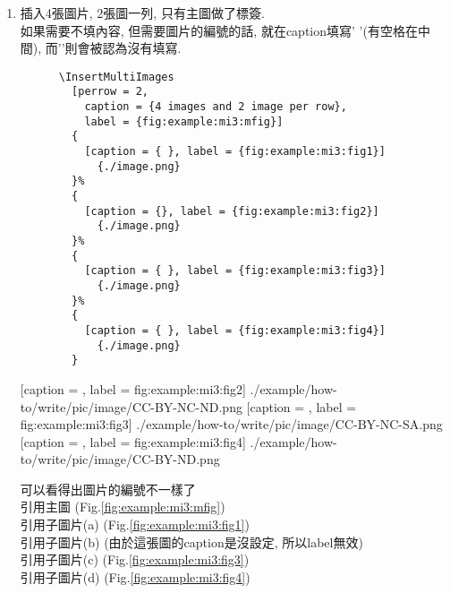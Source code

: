 \begin{enumerate}
{      e.g: 
      引用主圖 (Fig.\ref{fig:example:mi2:fig1}) ,
      引用子圖片 (Fig.\ref{fig:example:mi2:fig1}, Fig.\ref{fig:example:mi2:fig2}).
    } %

    \newpage
    \item
    {
      插入4張圖片, 2張圖一列, 只有主圖做了標簽.\\
      如果需要不填內容, 但需要圖片的編號的話, 就在caption填寫'{ }'(有空格在中間), 而'{}'則會被認為沒有填寫.
      \begin{verbatim}
      \InsertMultiImages
        [perrow = 2,
          caption = {4 images and 2 image per row},
          label = {fig:example:mi3:mfig}]
        {
          [caption = { }, label = {fig:example:mi3:fig1}]
            {./image.png}
        }%
        {
          [caption = {}, label = {fig:example:mi3:fig2}]
            {./image.png}
        }%
        {
          [caption = { }, label = {fig:example:mi3:fig3}]
            {./image.png}
        }%
        {
          [caption = { }, label = {fig:example:mi3:fig4}]
            {./image.png}
        }
      \end{verbatim}

        {
          [caption = {},
          label = {fig:example:mi3:fig2}]
            {./example/how-to/write/pic/image/CC-BY-NC-ND.png}
        }%
        {
          [caption = { },
          label = {fig:example:mi3:fig3}]
            {./example/how-to/write/pic/image/CC-BY-NC-SA.png}
        }%
        {
          [caption = { },
          label = {fig:example:mi3:fig4}]
            {./example/how-to/write/pic/image/CC-BY-ND.png}
        }

      可以看得出圖片的編號不一樣了\\
      引用主圖 (Fig.\ref{fig:example:mi3:mfig})\\
      引用子圖片(a) (Fig.\ref{fig:example:mi3:fig1})\\
      引用子圖片(b) (由於這張圖的caption是沒設定, 所以label無效)\\
      引用子圖片(c) (Fig.\ref{fig:example:mi3:fig3})\\
      引用子圖片(d) (Fig.\ref{fig:example:mi3:fig4})
    } %


\end{enumerate}
